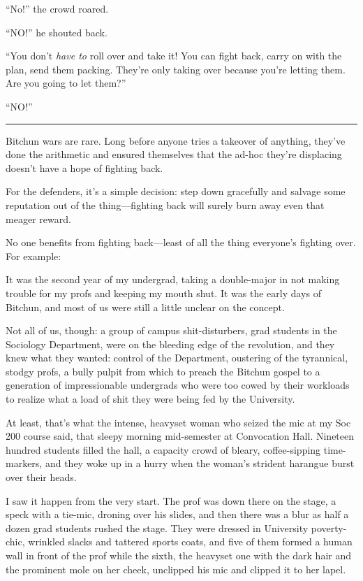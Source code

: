 “No!” the crowd roared.

“NO!” he shouted back.

“You don't \emph{have to} roll over and take it! You can fight
back, carry on with the plan, send them packing. They're only
taking over because you're letting them. Are you going to let
them?”

“NO!”

\begin{center}\rule{3in}{0.4pt}\end{center}

Bitchun wars are rare. Long before anyone tries a takeover of
anything, they've done the arithmetic and ensured themselves that
the ad-hoc they're displacing doesn't have a hope of fighting
back.

For the defenders, it's a simple decision: step down gracefully and
salvage some reputation out of the thing—fighting back will surely
burn away even that meager reward.

No one benefits from fighting back—least of all the thing
everyone's fighting over. For example:

It was the second year of my undergrad, taking a double-major in
not making trouble for my profs and keeping my mouth shut. It was
the early days of Bitchun, and most of us were still a little
unclear on the concept.

Not all of us, though: a group of campus shit-disturbers, grad
students in the Sociology Department, were on the bleeding edge of
the revolution, and they knew what they wanted: control of the
Department, oustering of the tyrannical, stodgy profs, a bully
pulpit from which to preach the Bitchun gospel to a generation of
impressionable undergrads who were too cowed by their workloads to
realize what a load of shit they were being fed by the University.

At least, that's what the intense, heavyset woman who seized the
mic at my Soc 200 course said, that sleepy morning mid-semester at
Convocation Hall. Nineteen hundred students filled the hall, a
capacity crowd of bleary, coffee-sipping time-markers, and they
woke up in a hurry when the woman's strident harangue burst over
their heads.

I saw it happen from the very start. The prof was down there on the
stage, a speck with a tie-mic, droning over his slides, and then
there was a blur as half a dozen grad students rushed the stage.
They were dressed in University poverty-chic, wrinkled slacks and
tattered sports coats, and five of them formed a human wall in
front of the prof while the sixth, the heavyset one with the dark
hair and the prominent mole on her cheek, unclipped his mic and
clipped it to her lapel.

